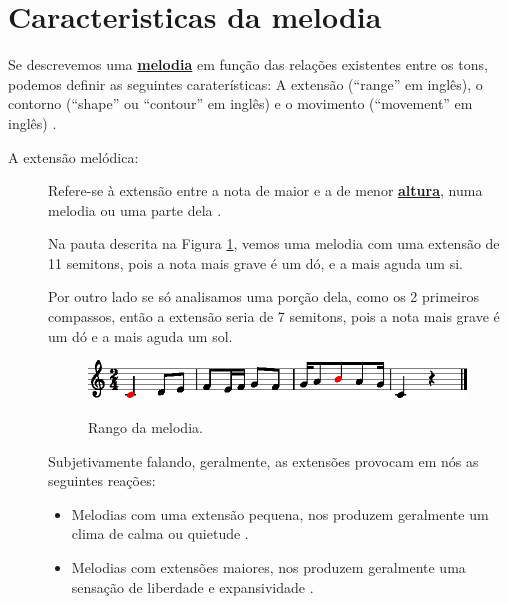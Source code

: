 \section{Caracteristicas da melodia}
\label{sec:caracteristicas:melodia}


Se descrevemos uma \hyperref[sec:pos:Melodia]{\textbf{melodia}} em função das relações existentes entre os tons,
podemos definir as seguintes caraterísticas: 
A extensão (``range'' em inglês),
o contorno  (``shape'' ou ``contour'' em inglês) e 
o movimento  (``movement'' em inglês) 
\cite[pp. 43]{holland2013music} \cite[pp. 50]{langer2017theory}.

\begin{description}
\item[A extensão melódica:] 
\label{ref:melodica:range}
Refere-se à extensão entre a nota de maior 
e a de menor \hyperref[sec:pos:Altura]{\textbf{altura}},
 numa melodia ou uma parte dela \cite[pp. 43]{holland2013music}.

\begin{example}
Na pauta descrita na Figura \ref{fig:melody:range:1}, 
vemos uma melodia com uma extensão de 11 semitons, pois a nota mais grave é um dó,
e a mais aguda um si.

Por outro lado se só analisamos uma porção dela, como os 2 primeiros compassos,
então a extensão seria de 7 semitons, pois a nota mais grave é um dó e a mais aguda um sol.
\end{example}
\begin{figure}[!h]
\centering
\href{https://drive.google.com/file/d/1t-idPWPqz53dfPF7Fwtju9xmcIW7ucFw/view?usp=sharing}{\includegraphics[width=0.99\textwidth]{chapters/cap-musicalidade-percepcion/melodia-carateristicas-range.eps}}
\caption{Rango da melodia.}
\label{fig:melody:range:1}
\end{figure}

Subjetivamente falando, geralmente, as extensões provocam em nós as seguintes reações:
\begin{itemize}
\item Melodias com uma extensão pequena, nos produzem geralmente um clima de calma ou quietude
 \cite[pp. 43]{holland2013music}.
\item Melodias com extensões maiores, nos produzem geralmente uma sensação de liberdade e expansividade
 \cite[pp. 43]{holland2013music}.
\end{itemize}


\end{description}

